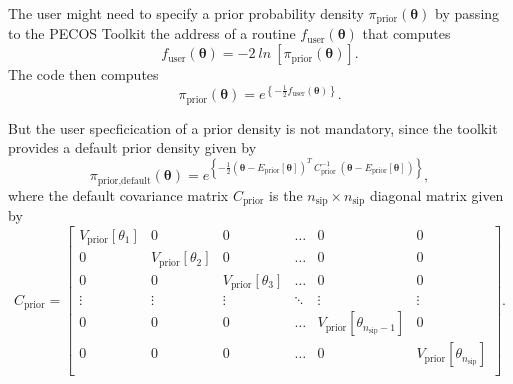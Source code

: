 The user might need to specify a prior probability density $\pi_{\text{prior}}(\boldsymbol{\theta})$
by passing to the PECOS Toolkit the address of a routine $f_{\text{user}}(\boldsymbol{\theta})$ that computes
\begin{equation}\label{eq-m2l-prior}
f_{\text{user}}(\boldsymbol{\theta})=
-2~ln~
\left[
\pi_{\text{prior}}(\boldsymbol{\theta})
\right].
\end{equation}
The code then computes
\begin{equation*}
\pi_{\text{prior}}(\boldsymbol{\theta}) = e^
{
\left\{
-\frac{1}{2}
f_{\text{user}}(\boldsymbol{\theta})
\right\}
}.
\end{equation*}

But the user specficication of a prior density is not mandatory, since the toolkit provides a default prior density given by
\begin{equation*}
\pi_{\text{prior,default}}(\boldsymbol{\theta}) =
e^{
\left\{
-\frac{1}{2}
(\boldsymbol{\theta}-E_{\text{prior}}[\boldsymbol{\theta}])^T
~C_{\text{prior}}^{-1}~
(\boldsymbol{\theta}-E_{\text{prior}}[\boldsymbol{\theta}])
\right\}
},
\end{equation*}
where the default covariance matrix $C_{\text{prior}}$ is the $n_{\text{sip}}\times n_{\text{sip}}$ diagonal matrix given by
\begin{equation}\label{eq-default-prior-cov-matrix}
C_{\text{prior}} =
\left[
\begin{array}{cccccc}
V_{\text{prior}}[\theta_1] & 0                          & 0                          & \ldots & 0                                           & 0      \\
0                          & V_{\text{prior}}[\theta_2] & 0                          & \ldots & 0                                           & 0      \\
0                          & 0                          & V_{\text{prior}}[\theta_3] & \ldots & 0                                           & 0      \\
\vdots                     & \vdots                     & \vdots                     & \ddots & \vdots                                      & \vdots \\
0                          & 0                          & 0                          & \ldots & V_{\text{prior}}[\theta_{n_{\text{sip}}-1}] & 0      \\
0                          & 0                          & 0                          & \ldots & 0                                           & V_{\text{prior}}[\theta_{n_{\text{sip}}}] \\
\end{array}
\right].
\end{equation}
